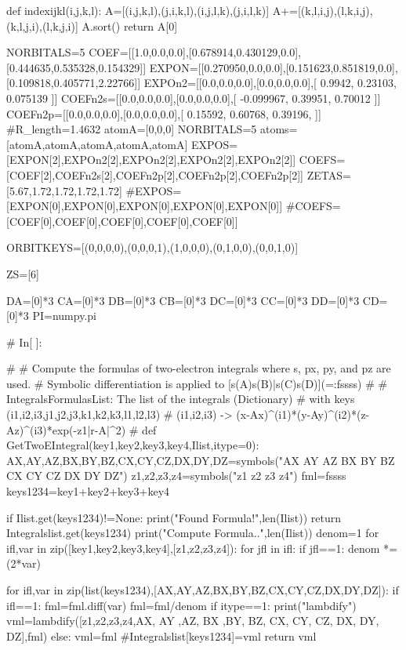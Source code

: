 def indexijkl(i,j,k,l):
    A=[(i,j,k,l),(j,i,k,l),(i,j,l,k),(j,i,l,k)]
    A+=[(k,l,i,j),(l,k,i,j),(k,l,j,i),(l,k,j,i)]
    A.sort()
    return A[0]






NORBITALS=5
COEF=[[1.0,0.0,0.0],[0.678914,0.430129,0.0],[0.444635,0.535328,0.154329]] 
EXPON=[[0.270950,0.0,0.0],[0.151623,0.851819,0.0],[0.109818,0.405771,2.22766]] 
EXPOn2=[[0.0,0.0,0.0],[0.0,0.0,0.0],[
0.9942,
0.23103,
0.075139
]]
COEFn2s=[[0.0,0.0,0.0],[0.0,0.0,0.0],[
    -0.099967,
    0.39951,
    0.70012
]]
COEFn2p=[[0.0,0.0,0.0],[0.0,0.0,0.0],[
0.15592,
0.60768,
0.39196,
]]
#R_length=1.4632
atomA=[0,0,0]
NORBITALS=5
atoms=[atomA,atomA,atomA,atomA,atomA]
EXPOS=[EXPON[2],EXPOn2[2],EXPOn2[2],EXPOn2[2],EXPOn2[2]]
COEFS=[COEF[2],COEFn2s[2],COEFn2p[2],COEFn2p[2],COEFn2p[2]]
ZETAS=[5.67,1.72,1.72,1.72,1.72]
#EXPOS=[EXPON[0],EXPON[0],EXPON[0],EXPON[0],EXPON[0]]
#COEFS=[COEF[0],COEF[0],COEF[0],COEF[0],COEF[0]]

ORBITKEYS=[(0,0,0,0),(0,0,0,1),(1,0,0,0),(0,1,0,0),(0,0,1,0)]

ZS=[6]

DA=[0]*3
CA=[0]*3
DB=[0]*3
CB=[0]*3
DC=[0]*3
CC=[0]*3
DD=[0]*3
CD=[0]*3
PI=numpy.pi


# In[ ]:


#
#  Compute the formulas of two-electron integrals where s, px, py, and pz are used.
#  Symbolic differentiation is applied to [s(A)s(B)|s(C)s(D)](=:fssss)
#
#  IntegralsFormulasList: The list of the integrals (Dictionary)
#                         with keys (i1,i2,i3,j1,j2,j3,k1,k2,k3,l1,l2,l3)
#  (i1,i2,i3) -> (x-Ax)^(i1)*(y-Ay)^(i2)*(z-Az)^(i3)*exp(-z1|r-A|^2)
#
def GetTwoEIntegral(key1,key2,key3,key4,Ilist,itype=0):
    AX,AY,AZ,BX,BY,BZ,CX,CY,CZ,DX,DY,DZ=symbols("AX AY AZ BX BY BZ CX CY CZ DX DY DZ")
    z1,z2,z3,z4=symbols("z1 z2 z3 z4")
    fml=fssss
    keys1234=key1+key2+key3+key4

    if Ilist.get(keys1234)!=None:
        print("Found Formula!",len(Ilist))
        return Integralslist.get(keys1234)
    print("Compute Formula..",len(Ilist))
    denom=1
    for ifl,var in zip([key1,key2,key3,key4],[z1,z2,z3,z4]):
        for jfl in ifl:
            if jfl==1:
                denom *= (2*var)
                       
    for ifl,var in zip(list(keys1234),[AX,AY,AZ,BX,BY,BZ,CX,CY,CZ,DX,DY,DZ]):
        if ifl==1:
            fml=fml.diff(var)
    fml=fml/denom
    if itype==1:
        print("lambdify")
        vml=lambdify([z1,z2,z3,z4,AX, AY ,AZ, BX ,BY, BZ, CX, CY, CZ, DX, DY, DZ],fml)
    else:
        vml=fml
    #Integralslist[keys1234]=vml
    return vml

